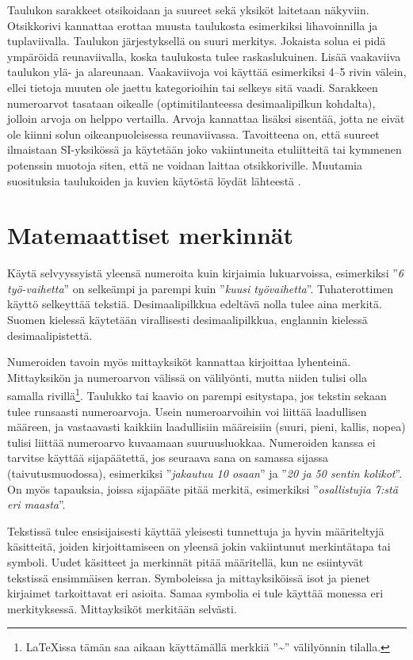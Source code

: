 \documentclass[globalnumbering,centeredcaptions,draftfooter]{tutthesis/tutthesis} %
\begin{document}
Taulukon sarakkeet otsikoidaan ja suureet sekä yksiköt laitetaan näkyviin.
Otsikkorivi kannattaa erottaa muusta taulukosta esimerkiksi lihavoinnilla ja tuplaviivalla.
Taulukon järjestyksellä on suuri merkitys. Jokaista solua ei pidä ympäröidä reunaviivalla, koska taulukosta tulee raskaslukuinen.
Lisää vaakaviiva taulukon ylä- ja alareunaan. Vaakaviivoja voi käyttää esimerkiksi 4–5 rivin välein, ellei tietoja muuten ole jaettu kategorioihin tai selkeys sitä vaadi. Sarakkeen numeroarvot tasataan oikealle (optimitilanteessa desimaalipilkun kohdalta), jolloin arvoja on helppo vertailla.
Arvoja kannattaa lisäksi sisentää, jotta ne eivät ole kiinni solun oikeanpuoleisessa reunaviivassa.
Tavoitteena on, että suureet ilmaistaan SI-yksikössä ja käytetään joko vakiintuneita etuliitteitä tai kymmenen potenssin muotoja siten, että ne voidaan laittaa otsikkoriville. Muutamia suosituksia taulukoiden ja kuvien käytöstä löydät lähteestä \citep{Salminen2012}.

\section{Matemaattiset merkinnät}

Käytä selvyyssyistä yleensä numeroita kuin kirjaimia lukuarvoissa, esimerkiksi ''\emph{6 työ-vaihetta}'' on selkeämpi ja parempi kuin ''\emph{kuusi työvaihetta}''.
Tuhaterottimen käyttö selkeyttää tekstiä.
Desimaalipilkkua edeltävä nolla tulee aina merkitä.
Suomen kielessä käytetään virallisesti desimaalipilkkua, englannin kielessä desimaalipistettä.

Numeroiden tavoin myös mittayksiköt kannattaa kirjoittaa lyhenteinä.
Mittayksikön ja numeroarvon välissä on välilyönti, mutta niiden tulisi olla samalla rivillä\footnote{LaTeXissa tämän saa aikaan käyttämällä merkkiä ''\textasciitilde'' välilyönnin tilalla.}.
Taulukko tai kaavio on parempi esitystapa, jos tekstin sekaan tulee runsaasti numeroarvoja.
Usein numeroarvoihin voi liittää laadullisen määreen, ja vastaavasti kaikkiin laadullisiin määreisiin (suuri, pieni, kallis, nopea) tulisi liittää numeroarvo kuvaamaan suuruusluokkaa.
Numeroiden kanssa ei tarvitse käyttää sijapäätettä, jos seuraava sana on samassa sijassa (taivutusmuodossa), esimerkiksi ''\emph{jakautuu 10 osaan}'' ja ''\emph{20 ja 50 sentin kolikot}''.
On myös tapauksia, joissa sijapääte pitää merkitä, esimerkiksi ''\emph{osallistujia 7:stä eri maasta}''.

Tekstissä tulee ensisijaisesti käyttää yleisesti tunnettuja ja hyvin määriteltyjä käsitteitä, joiden kirjoittamiseen on yleensä jokin vakiintunut merkintätapa tai symboli.
Uudet käsitteet ja merkinnät pitää määritellä, kun ne esiintyvät tekstissä ensimmäisen kerran.
Symboleissa ja mittayksiköissä isot ja pienet kirjaimet tarkoittavat eri asioita.
Samaa symbolia ei tule käyttää monessa eri merkityksessä.
Mittayksiköt merkitään selvästi.
\end{document}
